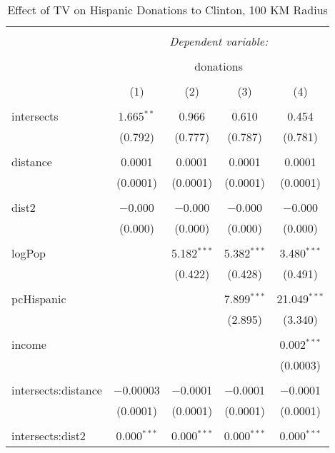 
\begin{table}[!htbp] \centering 
  \caption{Effect of TV on Hispanic Donations to Clinton, 100 KM Radius} 
  \label{} 
\begin{tabular}{@{\extracolsep{-5pt}}lcccc} 
\\[-1.8ex]\hline 
\hline \\[-1.8ex] 
 & \multicolumn{4}{c}{\textit{Dependent variable:}} \\ 
\cline{2-5} 
\\[-1.8ex] & \multicolumn{4}{c}{donations} \\ 
\\[-1.8ex] & (1) & (2) & (3) & (4)\\ 
\hline \\[-1.8ex] 
 intersects & 1.665$^{**}$ & 0.966 & 0.610 & 0.454 \\ 
  & (0.792) & (0.777) & (0.787) & (0.781) \\ 
  & & & & \\ 
 distance & 0.0001 & 0.0001 & 0.0001 & 0.0001 \\ 
  & (0.0001) & (0.0001) & (0.0001) & (0.0001) \\ 
  & & & & \\ 
 dist2 & $-$0.000 & $-$0.000 & $-$0.000 & $-$0.000 \\ 
  & (0.000) & (0.000) & (0.000) & (0.000) \\ 
  & & & & \\ 
 logPop &  & 5.182$^{***}$ & 5.382$^{***}$ & 3.480$^{***}$ \\ 
  &  & (0.422) & (0.428) & (0.491) \\ 
  & & & & \\ 
 pcHispanic &  &  & 7.899$^{***}$ & 21.049$^{***}$ \\ 
  &  &  & (2.895) & (3.340) \\ 
  & & & & \\ 
 income &  &  &  & 0.002$^{***}$ \\ 
  &  &  &  & (0.0003) \\ 
  & & & & \\ 
 intersects:distance & $-$0.00003 & $-$0.0001 & $-$0.0001 & $-$0.0001 \\ 
  & (0.0001) & (0.0001) & (0.0001) & (0.0001) \\ 
  & & & & \\ 
 intersects:dist2 & 0.000$^{***}$ & 0.000$^{***}$ & 0.000$^{***}$ & 0.000$^{***}$ \\ 

\end{tabular}
\end{table}
